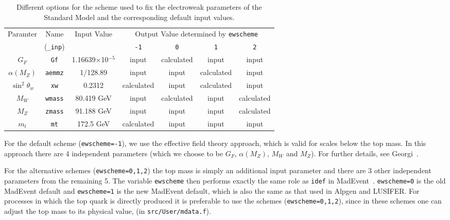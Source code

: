 \documentclass[12pt]{article}
\begin{document}
\begin{table}
\begin{center}
\begin{tabular}{|c|c|c|c|c|c|c|} \hline
 Paramter & Name & Input Value
 & \multicolumn{4}{c|}{Output Value determined by \tt ewscheme} \\
\cline{4-7}
& ({\tt \_inp}) & & {\tt -1} & {\tt 0} & {\tt 1} & {\tt 2} \\ \hline
$G_F$            & {\tt Gf}      & 1.16639$\times$10$^{-5}$ 
 & input & calculated & input & input \\
$\alpha(M_Z)$    & {\tt aemmz}   & 1/128.89                 
 & input & input & calculated & input \\
$\sin^2 \theta_w$& {\tt xw}      & 0.2312               
 & calculated & input & calculated & input \\
$M_W$            & {\tt wmass}   & 80.419 GeV                
 & input & calculated & input & calculated \\
$M_Z$            & {\tt zmass}   & 91.188 GeV               
 & input & input & input & calculated \\
$m_t$            & {\tt mt}      & 172.5 GeV                  
 & calculated & input & input & input \\
\hline
\end{tabular}
\caption{Different options for the scheme used to fix the electroweak
parameters of the Standard Model and the corresponding default input
values.}
\label{ewscheme}
\end{center}
\end{table}

For the default scheme ({\tt ewscheme=-1}), we use the effective field
theory approach, which is valid for scales below the top mass. In this
approach there are 4 independent parameters (which we choose to be
$G_F$, $\alpha(M_Z)$, $M_W$ and $M_Z$). For further details,
see Georgi~\cite{Georgi:1991ci}.

For the alternative schemes ({\tt ewscheme=0,1,2}) the top mass is simply
an additional input parameter and there are 3 other independent
parameters from the remaining 5. The variable {\tt ewscheme} then performs
exactly the same role as {\tt idef} in MadEvent~\cite{Maltoni:2002qb}.
{\tt ewscheme=0} is the old MadEvent default and {\tt ewscheme=1} is the
new MadEvent default, which is also the same as that used in Alpgen and
LUSIFER. For processes in which the top quark is directly produced  it is 
preferable to use  the schemes ({\tt ewscheme=0,1,2}), since in these schemes
one can adjust the top mass to its physical value, (in {\tt src/User/mdata.f}).
\end{document}
